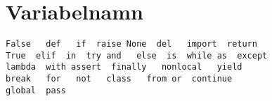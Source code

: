 \section{Variabelnamn}

\begin{frame}[fragile]
  \begin{remark}
    \begin{verbatim}
False   def   if  raise None  del   import  return
True  elif  in  try and   else  is  while as  except
lambda  with assert  finally   nonlocal   yield
break   for   not   class   from or  continue
global  pass
    \end{verbatim}
  \end{remark}
\end{frame}
